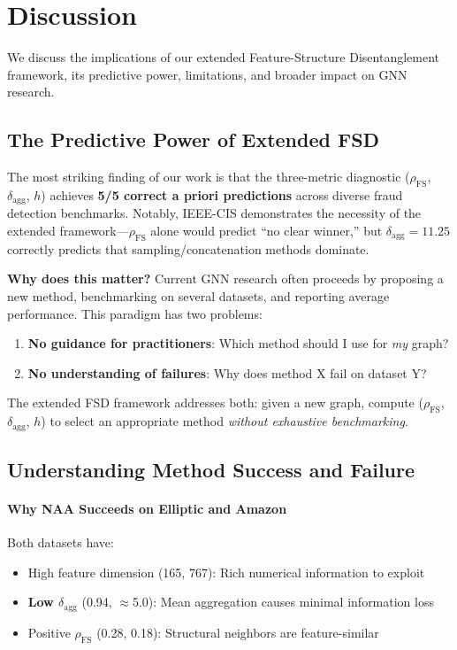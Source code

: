 \section{Discussion}
\label{sec:discussion}

We discuss the implications of our extended Feature-Structure Disentanglement framework, its predictive power, limitations, and broader impact on GNN research.

\subsection{The Predictive Power of Extended FSD}

The most striking finding of our work is that the three-metric diagnostic ($\rho_{\text{FS}}$, $\delta_{\text{agg}}$, $h$) achieves \textbf{5/5 correct a priori predictions} across diverse fraud detection benchmarks. Notably, IEEE-CIS demonstrates the necessity of the extended framework---$\rho_{\text{FS}}$ alone would predict ``no clear winner,'' but $\delta_{\text{agg}} = 11.25$ correctly predicts that sampling/concatenation methods dominate.

\textbf{Why does this matter?} Current GNN research often proceeds by proposing a new method, benchmarking on several datasets, and reporting average performance. This paradigm has two problems:
\begin{enumerate}
    \item \textbf{No guidance for practitioners}: Which method should I use for \textit{my} graph?
    \item \textbf{No understanding of failures}: Why does method X fail on dataset Y?
\end{enumerate}

The extended FSD framework addresses both: given a new graph, compute ($\rho_{\text{FS}}$, $\delta_{\text{agg}}$, $h$) to select an appropriate method \textit{without exhaustive benchmarking}.

\subsection{Understanding Method Success and Failure}

\paragraph{Why NAA Succeeds on Elliptic and Amazon}

Both datasets have:
\begin{itemize}
    \item High feature dimension (165, 767): Rich numerical information to exploit
    \item \textbf{Low $\delta_{\text{agg}}$} (0.94, $\approx$5.0): Mean aggregation causes minimal information loss
    \item Positive $\rho_{\text{FS}}$ (0.28, 0.18): Structural neighbors are feature-similar
\end{itemize}

